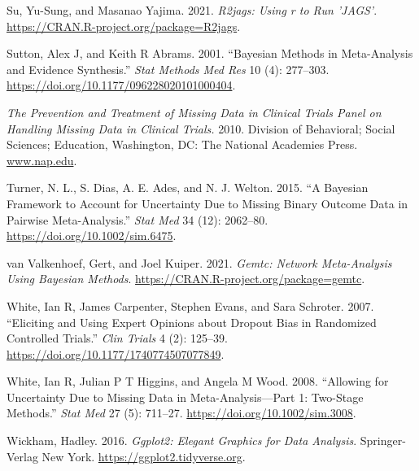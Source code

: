 \begin{CSLReferences}{1}{0}
\leavevmode{}%
Su, Yu-Sung, and Masanao Yajima. 2021. \emph{R2jags: Using r to Run 'JAGS'}. \url{https://CRAN.R-project.org/package=R2jags}.

\leavevmode{}%
Sutton, Alex J, and Keith R Abrams. 2001. {``Bayesian Methods in Meta-Analysis and Evidence Synthesis.''} \emph{Stat Methods Med Res} 10 (4): 277--303. \url{https://doi.org/10.1177/096228020101000404}.

\leavevmode{}%
\emph{The Prevention and Treatment of Missing Data in Clinical Trials Panel on Handling Missing Data in Clinical Trials.} 2010. Division of Behavioral; Social Sciences; Education, Washington, DC: The National Academies Press. \href{https://www.nap.edu}{www.nap.edu}.

\leavevmode{}%
Turner, N. L., S. Dias, A. E. Ades, and N. J. Welton. 2015. {``A Bayesian Framework to Account for Uncertainty Due to Missing Binary Outcome Data in Pairwise Meta-Analysis.''} \emph{Stat Med} 34 (12): 2062--80. \url{https://doi.org/10.1002/sim.6475}.

\leavevmode{}%
van Valkenhoef, Gert, and Joel Kuiper. 2021. \emph{Gemtc: Network Meta-Analysis Using Bayesian Methods}. \url{https://CRAN.R-project.org/package=gemtc}.

\leavevmode{}%
White, Ian R, James Carpenter, Stephen Evans, and Sara Schroter. 2007. {``Eliciting and Using Expert Opinions about Dropout Bias in Randomized Controlled Trials.''} \emph{Clin Trials} 4 (2): 125--39. \url{https://doi.org/10.1177/1740774507077849}.

\leavevmode{}%
White, Ian R, Julian P T Higgins, and Angela M Wood. 2008. {``Allowing for Uncertainty Due to Missing Data in Meta-Analysis---Part 1: Two-Stage Methods.''} \emph{Stat Med} 27 (5): 711--27. \url{https://doi.org/10.1002/sim.3008}.

\leavevmode{}%
Wickham, Hadley. 2016. \emph{Ggplot2: Elegant Graphics for Data Analysis}. Springer-Verlag New York. \url{https://ggplot2.tidyverse.org}.

\end{CSLReferences}



\address{%
Loukia M. Spineli\\
Midwifery Research and Education Unit\\%
Hannover Medical School\\ Carl-Neuber-Strasse 1, 30625, Hannover, Germany\\
%
\url{https://www.github.com/LoukiaSpin}\\%
\textit{ORCiD: \href{https://orcid.org/0000-0001-9515-582X}{0000-0001-9515-582X}}\\%
\href{mailto:Spineli.Loukia@mh-hannover.de}{\nolinkurl{Spineli.Loukia@mh-hannover.de}}%
}

